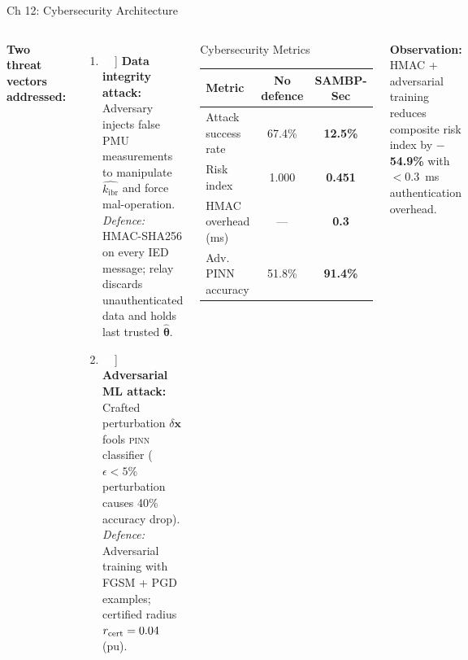 \documentclass[10pt,aspectratio=169]{beamer}
\newcommand{\bitem}[1]{%
  \makebox[16pt]{\textcolor{white}{\colorbox{iitmblue}{\bfseries\scriptsize#1}}}\,%
}
\newcommand{\obs}[1]{%
  {\color{iitmred}\textbf{Observation:} #1}%
}
\newcommand{\kibr}{k_{\mathrm{ibr}}}
\newcommand{\PINN}{\textsc{pinn}}
\begin{document}
\begin{frame}{Ch 12: Cybersecurity Architecture}
  \begin{columns}[T]
      \textbf{Two threat vectors addressed:}
      \begin{enumerate}\itemsep5pt
        \item[\bitem{1}] \textbf{Data integrity attack:}
          Adversary injects false PMU measurements
          to manipulate $\hat{\kibr}$ and force
          mal-operation.
          \medskip\\
          \textit{Defence:} HMAC-SHA256 on every
          IED message; relay discards unauthenticated
          data and holds last trusted $\hat{\boldsymbol{\theta}}$.

        \item[\bitem{2}] \textbf{Adversarial ML attack:}
          Crafted perturbation $\delta \mathbf{x}$
          fools \PINN{} classifier ($\epsilon < 5\%$
          perturbation causes 40\% accuracy drop).
          \medskip\\
          \textit{Defence:} Adversarial training with
          FGSM + PGD examples; certified radius
          $r_{\rm cert} = 0.04$ (pu).
      \end{enumerate}
      \begin{block}{\small Cybersecurity Metrics}
        \small
        \begin{tabular}{lcc}
          \toprule
          Metric & No defence & SAMBP-Sec\\
          \midrule
          Attack success rate & 67.4\% & \textbf{12.5\%}\\
          Risk index & 1.000 & \textbf{0.451}\\
          HMAC overhead (ms) & — & \textbf{0.3}\\
          Adv. PINN accuracy & 51.8\% & \textbf{91.4\%}\\
          \bottomrule
        \end{tabular}
      \end{block}
      \vspace{0.2cm}
      \obs{HMAC + adversarial training reduces
        composite risk index by \textbf{$-$54.9\%}
        with $<$0.3~ms authentication overhead.}
  \end{columns}
\end{frame}
\end{document}
